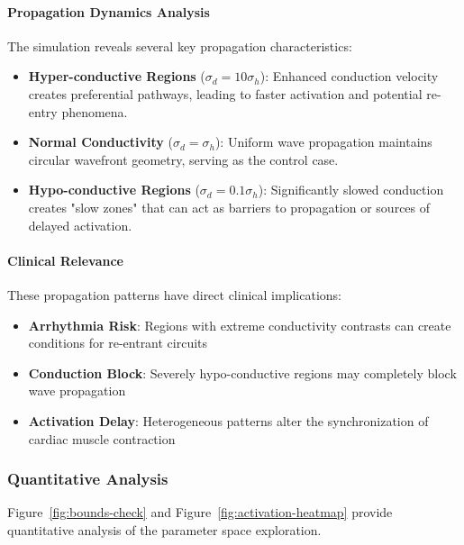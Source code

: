 \paragraph{Propagation Dynamics Analysis}

The simulation reveals several key propagation characteristics:

\begin{itemize}
    \item \textbf{Hyper-conductive Regions} ($\sigma_d = 10\sigma_h$): Enhanced conduction velocity creates preferential pathways, leading to faster activation and potential re-entry phenomena.
    
    \item \textbf{Normal Conductivity} ($\sigma_d = \sigma_h$): Uniform wave propagation maintains circular wavefront geometry, serving as the control case.
    
    \item \textbf{Hypo-conductive Regions} ($\sigma_d = 0.1\sigma_h$): Significantly slowed conduction creates "slow zones" that can act as barriers to propagation or sources of delayed activation.
\end{itemize}

\paragraph{Clinical Relevance}
These propagation patterns have direct clinical implications:
\begin{itemize}
    \item \textbf{Arrhythmia Risk}: Regions with extreme conductivity contrasts can create conditions for re-entrant circuits
    \item \textbf{Conduction Block}: Severely hypo-conductive regions may completely block wave propagation
    \item \textbf{Activation Delay}: Heterogeneous patterns alter the synchronization of cardiac muscle contraction
\end{itemize}

\subsubsection{Quantitative Analysis}

Figure~\ref{fig:bounds-check} and Figure~\ref{fig:activation-heatmap} provide quantitative analysis of the parameter space exploration.

